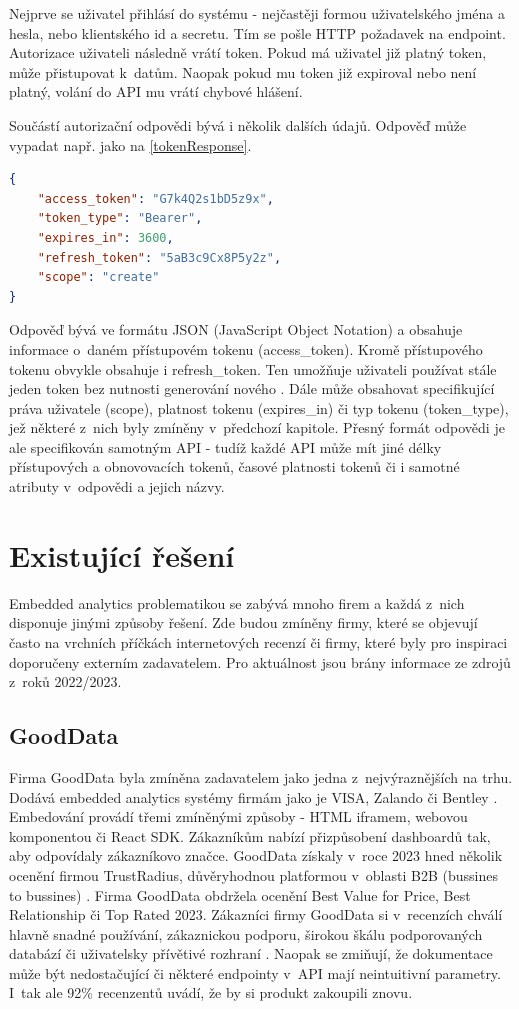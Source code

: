 \documentclass[czech, bc, kiv, he, iso690numb]{fasthesis}
\begin{document}
Nejprve se uživatel přihlásí do systému - nejčastěji formou uživatelského jména a hesla, nebo klientského id a secretu. Tím se pošle HTTP požadavek na endpoint. Autorizace uživateli následně
vrátí token. Pokud má uživatel již platný token, může přistupovat k~datům. Naopak pokud mu token již expiroval nebo není platný, volání do API mu vrátí chybové hlášení. 

Součástí autorizační odpovědi bývá i několik dalších údajů. Odpověď může vypadat např. jako na \ref{tokenResponse}. 

\begin{lstlisting}[language=json, caption={Ukázková odpověď autorizačního serveru}, label=tokenResponse]
{
	"access_token": "G7k4Q2s1bD5z9x",
	"token_type": "Bearer",
	"expires_in": 3600,
	"refresh_token": "5aB3c9Cx8P5y2z",
	"scope": "create"
}
\end{lstlisting}
	  
Odpověď bývá ve formátu JSON (JavaScript Object Notation) a obsahuje informace o~daném přístupovém tokenu (access\_token). Kromě přístupového tokenu obvykle obsahuje i refresh\_token. Ten umožňuje uživateli 
používat stále jeden token bez nutnosti generování nového \cite{oauthResponseExample}. Dále může obsahovat specifikující práva uživatele (scope), platnost tokenu (expires\_in) či typ tokenu (token\_type), jež některé z~nich byly zmíněny v~předchozí kapitole.
Přesný formát odpovědi je ale specifikován samotným API - tudíž každé API může mít jiné délky přístupových a obnovovacích tokenů, časové platnosti tokenů či i samotné atributy v~odpovědi a jejich názvy.
%
%
\section{Existující řešení}
Embedded analytics problematikou se zabývá mnoho firem a každá z~nich disponuje jinými způsoby řešení. Zde budou zmíněny firmy, které se objevují často na vrchních příčkách
internetových recenzí či firmy, které byly pro inspiraci doporučeny externím zadavatelem. Pro aktuálnost jsou brány informace ze zdrojů z~roků 2022/2023.
\subsection{GoodData}
Firma GoodData byla zmíněna zadavatelem jako jedna z~nejvýraznějších na trhu. Dodává embedded analytics systémy firmám jako je VISA, Zalando či Bentley \cite{goodDataEmbeddingPlatform}. 
Embedování provádí třemi zmíněnými způsoby - HTML iframem, webovou komponentou či React SDK. Zákazníkům nabízí přizpůsobení dashboardů tak, aby odpovídaly zákazníkovo značce. GoodData získaly
v~roce 2023 hned několik ocenění firmou TrustRadius, důvěryhodnou platformou v~oblasti B2B (bussines to bussines) \cite{trustRadiusDiscusionGoodData}. Firma GoodData obdržela ocenění Best Value for Price,
Best Relationship či Top Rated 2023. Zákazníci firmy GoodData si v~recenzích chválí hlavně snadné používání, zákaznickou podporu, širokou škálu podporovaných databází či uživatelsky přívětivé
rozhraní \cite{trustRadiusDiscusionGoodData}. Naopak se zmiňují, že dokumentace může být nedostačující či některé endpointy v~API mají neintuitivní parametry. I~tak ale 92\% recenzentů uvádí,
že by si produkt zakoupili znovu.
\end{document}

